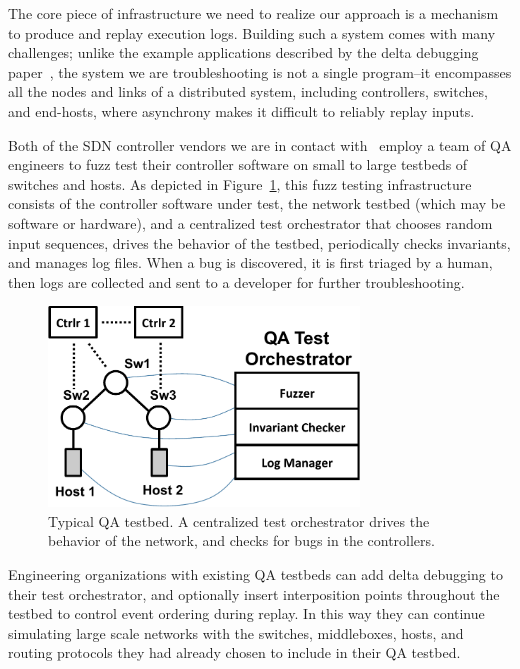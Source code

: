 The core piece of infrastructure we need to realize our approach is a
mechanism to produce and replay execution logs. Building such a system comes
with many challenges; unlike the example applications described
by the delta debugging paper~\cite{Zeller:1999:YMP:318773.318946}, the system we are troubleshooting is not a
single program--it encompasses all the nodes and links of a distributed system,
including controllers, switches, and end-hosts, where asynchrony
makes it difficult to reliably replay inputs.

Both of the SDN controller vendors we are in contact with~\cite{nicirahomepage,bigswitch} employ a team of QA
engineers to fuzz test their controller software on small to large testbeds of switches and hosts.
As depicted in Figure~\ref{fig:qa_cluster}, this fuzz testing infrastructure
consists of the controller software under test, the network testbed (which may
be software or hardware), and a centralized
test orchestrator
that chooses random input sequences, drives the behavior of the testbed,
periodically checks invariants, and manages log files. When a bug is discovered, it is first triaged
by a human, then logs are collected and sent to a developer for further troubleshooting.

\begin{figure}[t]
    \includegraphics[width=3.25in]{../diagrams/architecture/qa_cluster.pdf}
    \caption[]{\label{fig:qa_cluster} Typical QA testbed. A centralized test
    orchestrator drives the behavior of the network, and checks for bugs in
    the controllers.}
\end{figure}

Engineering organizations with existing
QA testbeds can add delta debugging to their test
orchestrator, and optionally insert interposition points throughout the
testbed to control event ordering during replay.
In this way they can continue simulating large scale networks with
the switches, middleboxes, hosts, and routing protocols they had already
chosen to include in their QA testbed.

